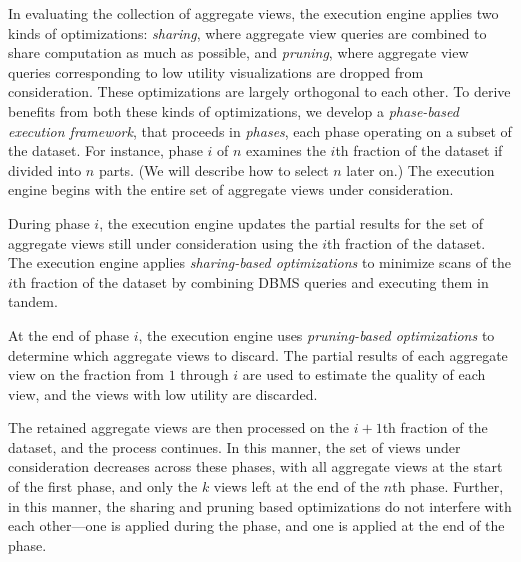In evaluating the collection of aggregate views, 
the execution engine  
applies two kinds of optimizations:
{\em sharing}, where aggregate view queries are combined to share computation
as much as possible, and {\em pruning}, where aggregate view queries
corresponding to low utility visualizations are dropped from consideration.
These optimizations are largely orthogonal to each other.
To derive benefits from both these kinds of optimizations,
we develop a {\em phase-based execution framework}, 
that proceeds in {\em phases},
each phase operating on a subset of the dataset.
For instance, phase $i$ of $n$ examines the $i$th fraction of the dataset
if divided into $n$ parts. (We will describe how to select $n$ later on.) 
The execution engine begins 
with the entire set of aggregate views under consideration.
\begin{denselist}
\item During phase $i$, the execution engine updates the partial results
for the set of aggregate views
still under consideration using the $i$th fraction of the dataset.
The execution engine applies {\em sharing-based optimizations}
to minimize scans of the $i$th fraction of the dataset by combining
DBMS queries and executing them in tandem.
\item At the end of phase $i$, the execution engine uses 
{\em pruning-based optimizations} to determine which aggregate views to discard.
The partial results of each aggregate view on the fraction from $1$ through $i$ are used to 
estimate the quality of each view, and the views with low utility are discarded. 
\end{denselist}
The retained aggregate views are then processed on the $i+1$th fraction of the dataset,
and the process continues. 
In this manner, the set of views under consideration
decreases across these phases, with all aggregate views at the start 
of the first phase, and only the $k$ views left
at the end of the $n$th phase.
Further, in this manner, the sharing and pruning based optimizations do
not interfere with each other---one is applied during the phase,
and one is applied at the end of the phase.

